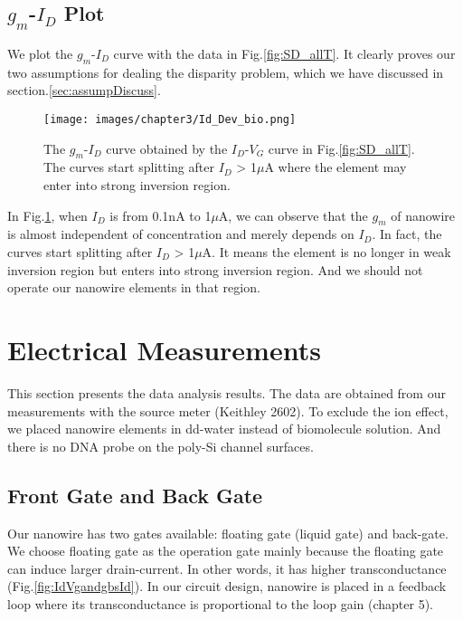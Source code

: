 \subsection{$g_m$-$I_D$ Plot} \label{section:disparityBio}
We plot the $g_m$-$I_D$ curve with the data in Fig.\ref{fig:SD_allT}.
It clearly proves our two assumptions for dealing the disparity problem, which we have discussed in section.\ref{sec:assumpDiscuss}.

\begin{figure}[htb]
        \texttt{[image: images/chapter3/Id\_Dev\_bio.png]}
    \caption{The $g_m$-$I_D$ curve obtained by the $I_D$-$V_G$ curve in Fig.\ref{fig:SD_allT}. The curves start splitting after $I_D$ > 1$\mu$A where the element may enter into strong inversion region.}
    \label{fig:gmId}
\end{figure}

In Fig.\ref{fig:gmId}, when $I_D$ is from 0.1nA to 1$\mu$A, we can observe that the $g_m$ of nanowire is almost independent of concentration and merely depends on $I_D$.
In fact, the curves start splitting after $I_D$ > 1$\mu$A.
It means the element is no longer in weak inversion region but enters into strong inversion region.
And we should not operate our nanowire elements in that region.











\section{Electrical Measurements}
This section presents the data analysis results.
The data are obtained from our measurements with the source meter (Keithley 2602).
To exclude the ion effect, we placed nanowire elements in dd-water instead of biomolecule solution.
And there is no DNA probe on the poly-Si channel surfaces.

\subsection{Front Gate and Back Gate}
Our nanowire has two gates available: floating gate (liquid gate) and back-gate.
We choose floating gate as the operation gate mainly because the floating gate can induce larger drain-current.
In other words, it has higher transconductance (Fig.\ref{fig:IdVgandgbsId}).
In our circuit design, nanowire is placed in a feedback loop where its transconductance is proportional to the loop gain (chapter 5).


